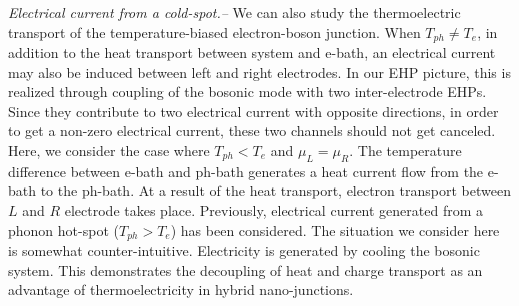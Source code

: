\documentclass[aps
,twocolumn
,floatfix,footinbib,prl
]{revtex4-1}
\begin{document}
\emph{ Electrical current from a cold-spot.--}
We can also study the thermoelectric transport of the temperature-biased electron-boson junction. When $T_{ph}\neq T_e$, in addition to the heat transport between system and e-bath, an electrical current may also be induced between left and right electrodes\cite{entinwuhlman2010three,sanchez2011optimal}. In our EHP picture, this is realized through coupling of the bosonic mode with two inter-electrode EHPs. Since they contribute to two electrical current with opposite directions, in order to get a non-zero electrical current, these two channels should not get canceled. Here, we consider the case where $T_{ph}<T_{e}$ and $\mu_L=\mu_R$. The temperature difference between e-bath and ph-bath generates a heat current flow from the e-bath to the ph-bath. At a result of the heat transport, electron transport between $L$ and $R$ electrode takes place. Previously, electrical current generated from a phonon hot-spot ($T_{ph}>T_e$) has been considered\cite{entinwuhlman2010three}. The situation we consider here is somewhat counter-intuitive. Electricity is generated by cooling the bosonic system. This demonstrates the decoupling of heat and charge transport as an advantage of thermoelectricity in hybrid nano-junctions.
\end{document}
